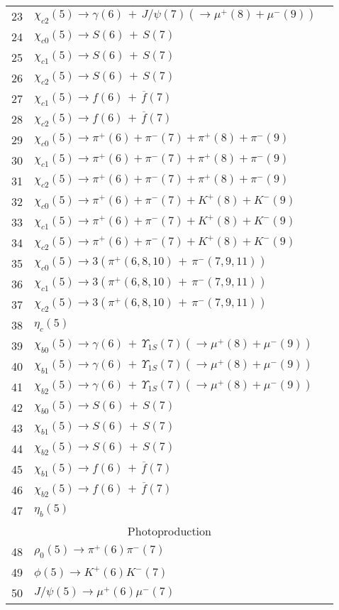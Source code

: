 \documentclass[12pt]{article}
\begin{document}
\begin{center}
\begin{longtable}{|c|l|l|}
23&$\chi_{c2}(5)\to \gamma(6)\,+\,J/\psi(7)(\to \mu^+(8)+\mu^-(9))$& \\
24&$\chi_{c0}(5)\to S(6)\,+\,S(7)$& \\
25&$\chi_{c1}(5)\to S(6)\,+\,S(7)$& \\
26&$\chi_{c2}(5)\to S(6)\,+\,S(7)$& \\
27&$\chi_{c1}(5)\to f(6)\,+\,\overline{f}(7)$& \\
28&$\chi_{c2}(5)\to f(6)\,+\,\overline{f}(7)$& \\
29&$\chi_{c0}(5)\to \pi^+(6)+\pi^-(7)+\pi^+(8)+\pi^-(9)$& \\
30&$\chi_{c1}(5)\to \pi^+(6)+\pi^-(7)+\pi^+(8)+\pi^-(9)$& \\
31&$\chi_{c2}(5)\to \pi^+(6)+\pi^-(7)+\pi^+(8)+\pi^-(9)$& \\
32&$\chi_{c0}(5)\to \pi^+(6)+\pi^-(7)+K^+(8)+K^-(9)$& \\
33&$\chi_{c1}(5)\to \pi^+(6)+\pi^-(7)+K^+(8)+K^-(9)$& \\
34&$\chi_{c2}(5)\to \pi^+(6)+\pi^-(7)+K^+(8)+K^-(9)$& \\
35&$\chi_{c0}(5)\to 3(\pi^+(6,8,10)\,+\,\pi^-(7,9,11))$& \\
36&$\chi_{c1}(5)\to 3(\pi^+(6,8,10)\,+\,\pi^-(7,9,11))$& \\
37&$\chi_{c2}(5)\to 3(\pi^+(6,8,10)\,+\,\pi^-(7,9,11))$& \\
38&$\eta_c(5)$& \\
39&$\chi_{b0}(5)\to \gamma(6)\,+\,\Upsilon_{1S}(7)(\to \mu^+(8)+\mu^-(9))$& \\
40&$\chi_{b1}(5)\to \gamma(6)\,+\,\Upsilon_{1S}(7)(\to \mu^+(8)+\mu^-(9))$& \\
41&$\chi_{b2}(5)\to \gamma(6)\,+\,\Upsilon_{1S}(7)(\to \mu^+(8)+\mu^-(9))$& \\
42&$\chi_{b0}(5)\to S(6)\,+\,S(7)$& \\
43&$\chi_{b1}(5)\to S(6)\,+\,S(7)$& \\
44&$\chi_{b2}(5)\to S(6)\,+\,S(7)$& \\
45&$\chi_{b1}(5)\to f(6)\,+\,\overline{f}(7)$& \\
46&$\chi_{b2}(5)\to f(6)\,+\,\overline{f}(7)$& \\
47& $\eta_b(5)$& \\
\hline\hline
\multicolumn{3}{|c|}{Photoproduction}\\
\hline\hline
48&$\rho_0(5)\to \pi^+(6)\pi^-(7)$& \\
49&$\phi(5)\to K^+(6)K^-(7)$& \\
50&$J/\psi(5)\to \mu^+(6)\mu^-(7)$& \\

\end{longtable}
\end{center}
\end{document}
